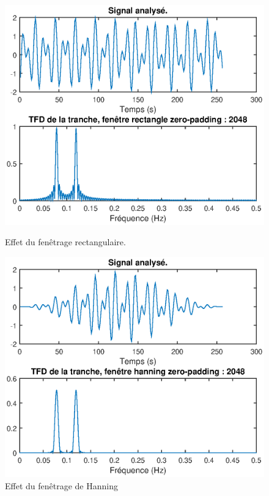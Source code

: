 \documentclass[french]{article}
\begin{document}
  
\begin{figure}[h!]
	\centering
  	\begin{minipage}{0.45\textwidth}
  		\centering
  		\includegraphics[width=\textwidth]{images/rectangle.eps}
  		\caption{Effet du fenêtrage rectangulaire.}
  		\label{fig:fen_rectangle}
  	\end{minipage}
  	\begin{minipage}{0.45\textwidth}
  		\centering
  		\includegraphics[width=\textwidth]{images/hanning.eps}
  		\caption{Effet du fenêtrage de Hanning}

\end{minipage}
\end{figure}
\end{document}

